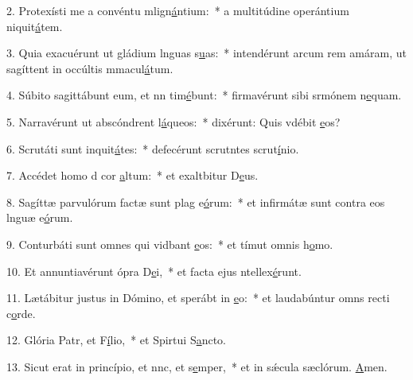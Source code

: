 2. Protexísti me a convéntu mlign\uline{á}ntium:~* a multitúdine operántium niquit\uline{á}tem.\par 
3. Quia exacuérunt ut gládium lnguas s\uline{u}as:~* intendérunt arcum rem amáram, ut sagíttent in occúltis mmacul\uline{á}tum.\par 
4. Súbito sagittábunt eum, et nn tim\uline{é}bunt:~* firmavérunt sibi srmónem n\uline{e}quam.\par 
5. Narravérunt ut abscóndrent l\uline{á}queos:~* dixérunt: Quis vdébit \uline{e}os?\par 
6. Scrutáti sunt inquit\uline{á}tes:~* defecérunt scrutntes scrut\uline{í}nio.\par 
7. Accédet homo d cor \uline{a}ltum:~* et exaltbitur D\uline{e}us.\par 
8. Sagíttæ parvulórum factæ sunt plag e\uline{ó}rum:~* et infirmátæ sunt contra eos lnguæ e\uline{ó}rum.\par 
9. Conturbáti sunt omnes qui vidbant \uline{e}os:~* et tímut omnis h\uline{o}mo.\par 
10. Et annuntiavérunt ópra D\uline{e}i,~* et facta ejus ntellex\uline{é}runt.\par 
11. Lætábitur justus in Dómino, et sperábt in \uline{e}o:~* et laudabúntur omns recti c\uline{o}rde.\par 
12. Glória Patr, et F\uline{í}lio,~* et Spirtui S\uline{a}ncto.\par 
13. Sicut erat in princípio, et nnc, et s\uline{e}mper,~* et in sǽcula sæclórum. \uline{A}men.\par 
